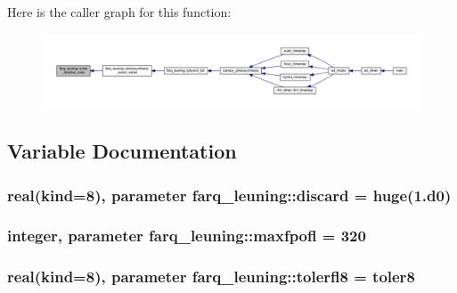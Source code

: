 Here is the caller graph for this function\+:\nopagebreak
\begin{figure}[H]
\begin{center}
\leavevmode
\includegraphics[width=350pt]{namespacefarq__leuning_a88f53f468e321e185e87a1fa9f890116_icgraph}
\end{center}
\end{figure}




\subsection{Variable Documentation}
\subsubsection[{\texorpdfstring{discard}{discard}}]{\setlength{\rightskip}{0pt plus 5cm}real(kind=8), parameter farq\+\_\+leuning\+::discard = huge(1.d0)}\hypertarget{namespacefarq__leuning_a31a2c362c8646a0912470a61a19135b2}{}\label{namespacefarq__leuning_a31a2c362c8646a0912470a61a19135b2}
\subsubsection[{\texorpdfstring{maxfpofl}{maxfpofl}}]{\setlength{\rightskip}{0pt plus 5cm}integer, parameter farq\+\_\+leuning\+::maxfpofl = 320}\hypertarget{namespacefarq__leuning_ae18ccfcc4ad61a2d80f126c65258fffd}{}\label{namespacefarq__leuning_ae18ccfcc4ad61a2d80f126c65258fffd}
\subsubsection[{\texorpdfstring{tolerfl8}{tolerfl8}}]{\setlength{\rightskip}{0pt plus 5cm}real(kind=8), parameter farq\+\_\+leuning\+::tolerfl8 = toler8}\hypertarget{namespacefarq__leuning_a544a9b3986d12bf60c748eff03f49665}{}\label{namespacefarq__leuning_a544a9b3986d12bf60c748eff03f49665}
